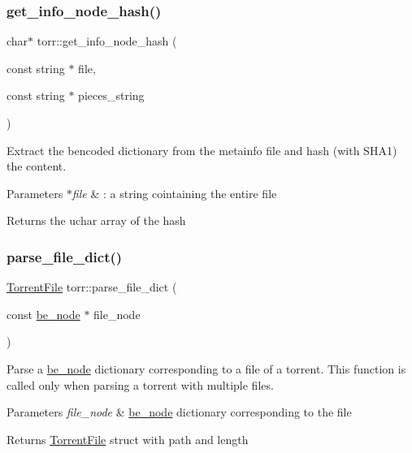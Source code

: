 \subsubsection{\texorpdfstring{get\+\_\+info\+\_\+node\+\_\+hash()}{get\_info\_node\_hash()}}
{\footnotesize\ttfamily char$\ast$ torr\+::get\+\_\+info\+\_\+node\+\_\+hash (\begin{DoxyParamCaption}\item[{const string $\ast$}]{file,  }\item[{const string $\ast$}]{pieces\+\_\+string }\end{DoxyParamCaption})}



Extract the bencoded dictionary from the metainfo file and hash (with S\+H\+A1) the content. 


\begin{DoxyParams}{Parameters}
{\em $\ast$file} & \+: a string cointaining the entire file\\
\hline
\end{DoxyParams}
\begin{DoxyReturn}{Returns}
the uchar array of the hash 
\end{DoxyReturn}
\mbox{\label{namespacetorr_a7e45f5777369e0882a30859e1bc511fa}} 
\subsubsection{\texorpdfstring{parse\+\_\+file\+\_\+dict()}{parse\_file\_dict()}}
{\footnotesize\ttfamily \hyperlink{structtorr_1_1TorrentFile}{Torrent\+File} torr\+::parse\+\_\+file\+\_\+dict (\begin{DoxyParamCaption}\item[{const \hyperlink{structbe__node}{be\+\_\+node} $\ast$}]{file\+\_\+node }\end{DoxyParamCaption})}



Parse a \hyperlink{structbe__node}{be\+\_\+node} dictionary corresponding to a file of a torrent. This function is called only when parsing a torrent with multiple files. 


\begin{DoxyParams}{Parameters}
{\em file\+\_\+node} & \hyperlink{structbe__node}{be\+\_\+node} dictionary corresponding to the file \\
\hline
\end{DoxyParams}
\begin{DoxyReturn}{Returns}
\hyperlink{structtorr_1_1TorrentFile}{Torrent\+File} struct with path and length 
\end{DoxyReturn}
\mbox{\label{namespacetorr_a606e7ff691f182e90c3eb16a4d99082d}} 
